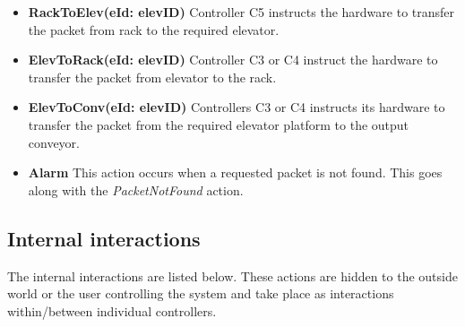\begin{itemize}
\item \textbf{RackToElev(eId: elevID)}
Controller C5 instructs the hardware to transfer the packet from rack to the required elevator.

\item \textbf{ElevToRack(eId: elevID)}
Controller C3 or C4 instruct the hardware to transfer the packet from elevator to the rack.

\item \textbf{ElevToConv(eId: elevID)}
Controllers C3 or C4 instructs its hardware to transfer the packet from the required elevator platform to the output conveyor.

\item \textbf{Alarm}
This action occurs when a requested packet is not found. This goes along with the \textit{PacketNotFound} action.
\end{itemize}

\subsection*{Internal interactions}
The internal interactions are listed below. These actions are hidden to the outside world or the user controlling the system and take place as interactions within/between individual controllers.


